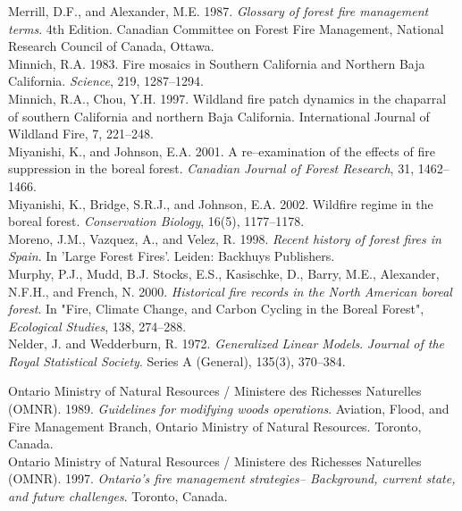 \begin{spacing}{1.5}
\noindent Merrill, D.F., and Alexander, M.E. 1987. \emph{Glossary of forest fire management terms}. 4th Edition. Canadian Committee on Forest Fire Management, National Research Council of Canada, Ottawa.\\

\noindent Minnich, R.A. 1983. Fire mosaics in Southern California and Northern Baja California. \emph{Science}, 219, 1287--1294.\\

\noindent Minnich, R.A., Chou, Y.H. 1997. Wildland fire patch dynamics in the chaparral of southern California and northern Baja California. International Journal of Wildland Fire, 7, 221--248.\\

\noindent Miyanishi, K., and Johnson, E.A. 2001. A re--examination of the effects of fire suppression in the boreal forest. \emph{Canadian Journal of Forest Research}, 31, 1462--1466.\\

\noindent Miyanishi, K., Bridge, S.R.J., and Johnson, E.A. 2002. Wildfire regime in the boreal forest. \emph{Conservation Biology}, 16(5), 1177--1178.\\

\noindent Moreno, J.M., Vazquez, A., and Velez, R. 1998. \emph{Recent history of forest fires in Spain}. In 'Large Forest Fires'.  Leiden: Backhuys Publishers.\\

\noindent Murphy, P.J., Mudd, B.J. Stocks, E.S., Kasischke, D., Barry, M.E., Alexander, N.F.H., and French, N. 2000. \emph{Historical fire records in the North American boreal forest}. In "Fire, Climate Change, and Carbon Cycling in the Boreal Forest", \emph{Ecological Studies}, 138, 274--288.\\

\noindent Nelder, J. and Wedderburn, R. 1972. \emph{Generalized Linear Models}. \emph{Journal of the Royal Statistical Society}. Series A (General), 135(3), 370--384.\\

\clearpage

\noindent Ontario Ministry of Natural Resources / Ministere des Richesses Naturelles (OMNR). 1989. \emph{Guidelines for modifying woods operations}. Aviation, Flood, and Fire Management Branch, Ontario Ministry of Natural Resources. Toronto, Canada. \\

\noindent Ontario Ministry of Natural Resources / Ministere des Richesses Naturelles (OMNR). 1997. \emph{Ontario's fire management strategies-- Background, current state, and future challenges}. Toronto, Canada.\\


\end{spacing}
